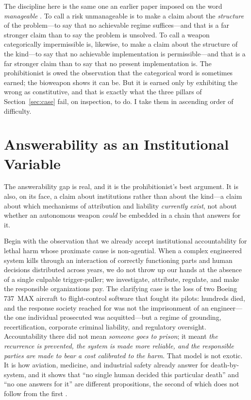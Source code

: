 \documentclass[11pt]{article}
\begin{document}
The discipline here is the same one an earlier paper imposed on the word \emph{manageable} \citep{penumbra2026}. To call a risk unmanageable is to make a claim about the \emph{structure} of the problem---to say that no achievable regime suffices---and that is a far stronger claim than to say the problem is unsolved. To call a weapon categorically impermissible is, likewise, to make a claim about the structure of the kind---to say that no achievable implementation is permissible---and that is a far stronger claim than to say that no present implementation is. The prohibitionist is owed the observation that the categorical word is sometimes earned; the bioweapon shows it can be. But it is earned only by exhibiting the wrong as constitutive, and that is exactly what the three pillars of Section~\ref{sec:case} fail, on inspection, to do. I take them in ascending order of difficulty.

\section{Answerability as an Institutional Variable}
\label{sec:answerability}

The answerability gap is real, and it is the prohibitionist's best argument. It is also, on its face, a claim about institutions rather than about the kind---a claim about which mechanisms of attribution and liability \emph{currently exist}, not about whether an autonomous weapon \emph{could} be embedded in a chain that answers for it.

Begin with the observation that we already accept institutional accountability for lethal harm whose proximate cause is non-agential. When a complex engineered system kills through an interaction of correctly functioning parts and human decisions distributed across years, we do not throw up our hands at the absence of a single culpable trigger-puller; we investigate, attribute, regulate, and make the responsible organizations pay. The clarifying case is the loss of two Boeing 737~MAX aircraft to flight-control software that fought its pilots: hundreds died, and the response society reached for was not the imprisonment of an engineer---the one individual prosecuted was acquitted---but a regime of grounding, recertification, corporate criminal liability, and regulatory oversight. Accountability there did not mean \emph{someone goes to prison}; it meant \emph{the recurrence is prevented, the system is made more reliable, and the responsible parties are made to bear a cost calibrated to the harm}. That model is not exotic. It is how aviation, medicine, and industrial safety already answer for death-by-system, and it shows that ``no single human decided this particular death'' and ``no one answers for it'' are different propositions, the second of which does not follow from the first \citep{elish2019}.
\end{document}
